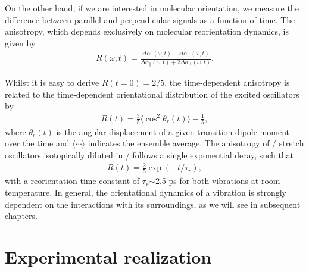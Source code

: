 On the other hand, if we are interested in molecular orientation, we measure the difference between parallel and perpendicular signals as a function of time. The anisotropy, which depends exclusively on molecular reorientation dynamics, is given by
\begin{eqnarray}
R (\omega,t) = \frac{\Delta \alpha_\parallel (\omega, t) -  \Delta \alpha_\perp (\omega, t)}{\Delta \alpha_\parallel (\omega, t) + 2 \Delta \alpha_\perp (\omega, t)}.
\label{anisotropysignal}
\end{eqnarray}

Whilst it is easy to derive $R (t=0) = 2/5$, the time-dependent anisotropy is related to the time-dependent orientational distribution of the excited oscillators by\!\cite{Lipari1980}
\begin{eqnarray}
R (t) = \frac{3}{5} \langle \cos^2 \theta_r(t)   \rangle - \frac{1}{5},
\end{eqnarray}
where $\theta_r (t)$ is the angular displacement of a given transition dipole moment over the time and $\langle\cdots\rangle$ indicates the ensemble average. The anisotropy of / stretch oscillators isotopically diluted in / follows a single exponential decay, such that
\begin{eqnarray}
R (t) = \frac{2}{5} \exp(-t / \tau_r),
\end{eqnarray}
with a reorientation time constant of $\tau_r$$\sim$2.5 ps for both vibrations at room temperature.\!\cite{Rezus2005,Rezus2006} In general, the orientational dynamics of a vibration is strongly dependent on the interactions with its surroundings, as we will see in subsequent chapters.



\section{Experimental realization}\label{ExperimentTRVS}



